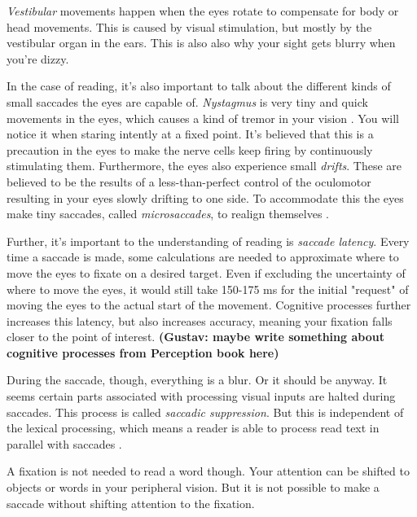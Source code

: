 \textit{Vestibular} movements happen when the eyes rotate to compensate for body or head movements. This is caused by visual stimulation, but mostly by the vestibular organ in the ears. This is also also why your sight gets blurry when you're dizzy.

In the case of reading, it's also important to talk about the different kinds of small saccades the eyes are capable of. \textit{Nystagmus} is very tiny and quick movements in the eyes, which causes a kind of tremor in your vision \cite{eyeMovement}. You will notice it when staring intently at a fixed point. It's believed that this is a precaution in the eyes to make the nerve cells keep firing by continuously stimulating them. Furthermore, the eyes also experience small \textit{drifts}. These are believed to be the results of a less-than-perfect control of the oculomotor resulting in your eyes slowly drifting to one side. To accommodate this the eyes make tiny saccades, called \textit{microsaccades}, to realign themselves \cite{eyeMovement}.

Further, it's important to the understanding of reading is \textit{saccade latency}. Every time a saccade is made, some calculations are needed to approximate where to move the eyes to fixate on a desired target. Even if excluding the uncertainty of where to move the eyes, it would still take 150-175 ms for the initial "request" of moving the eyes to the actual start of the movement. Cognitive processes further increases this latency, but also increases accuracy, meaning your fixation falls closer to the point of interest.
\textbf{
(Gustav: maybe write something about cognitive processes from Perception book here)}

During the saccade, though, everything is a blur. Or it should be anyway. It seems certain parts associated with processing visual inputs are halted during saccades. This process is called \textit{saccadic suppression}. But this is independent of the lexical processing, which means a reader is able to process read text in parallel with saccades \cite{KILDE MATHIAS}.

A fixation is not needed to read a word though. Your attention can be shifted to objects or words in your peripheral vision. But it is not possible to make a saccade without shifting attention to the fixation.

